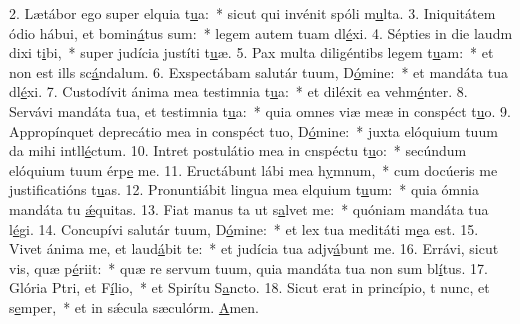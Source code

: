 2. Lætábor ego super elquia t\uline{u}a:~* sicut qui invénit spóli m\uline{u}lta.
3. Iniquitátem ódio hábui, et bomin\uline{á}tus sum:~* legem autem tuam dl\uline{é}xi.
4. Sépties in die laudm dixi t\uline{i}bi,~* super judícia justíti t\uline{u}æ.
5. Pax multa diligéntibs legem t\uline{u}am:~* et non est ills sc\uline{á}ndalum.
6. Exspectábam salutár tuum, D\uline{ó}mine:~* et mandáta tua dl\uline{é}xi.
7. Custodívit ánima mea testimnia t\uline{u}a:~* et diléxit ea vehm\uline{é}nter.
8. Servávi mandáta tua, et testimnia t\uline{u}a:~* quia omnes viæ meæ in conspéct t\uline{u}o.
9. Appropínquet deprecátio mea in conspéct tuo, D\uline{ó}mine:~* juxta elóquium tuum da mihi intll\uline{é}ctum.
10. Intret postulátio mea in cnspéctu t\uline{u}o:~* secúndum elóquium tuum érp\uline{e} me.
11. Eructábunt lábi mea h\uline{y}mnum,~* cum docúeris me justificatións t\uline{u}as.
12. Pronuntiábit lingua mea elquium t\uline{u}um:~* quia ómnia mandáta tu \uline{ǽ}quitas.
13. Fiat manus ta ut s\uline{a}lvet me:~* quóniam mandáta tua l\uline{é}gi.
14. Concupívi salutár tuum, D\uline{ó}mine:~* et lex tua meditáti m\uline{e}a est.
15. Vivet ánima me, et laud\uline{á}bit te:~* et judícia tua adjv\uline{á}bunt me.
16. Errávi, sicut vis, quæ p\uline{é}riit:~* quæ re servum tuum, quia mandáta tua non sum bl\uline{í}tus.
17. Glória Ptri, et F\uline{í}lio,~* et Spirítu S\uline{a}ncto.
18. Sicut erat in princípio, t nunc, et s\uline{e}mper,~* et in sǽcula sæculórm. \uline{A}men.
